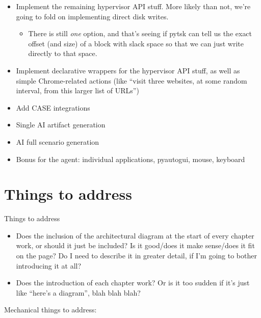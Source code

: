 \begin{itemize}
\tightlist
\item
  Implement the remaining hypervisor API stuff. More likely than not,
  we're going to fold on implementing direct disk writes.

  \begin{itemize}
  \tightlist
  \item
    There is still \emph{one} option, and that's seeing if pytsk can
    tell us the exact offset (and size) of a block with slack space so
    that we can just write directly to that space.
  \end{itemize}
\item
  Implement declarative wrappers for the hypervisor API stuff, as well
  as simple Chrome-related actions (like ``visit three websites, at some
  random interval, from this larger list of URLs'')
\item
  Add CASE integrations
\item
  Single AI artifact generation
\item
  AI full scenario generation
\item
  Bonus for the agent: individual applications, pyautogui, mouse,
  keyboard
\end{itemize}

\section{Things to address}\label{things-to-address}

Things to address

\begin{itemize}
\tightlist
\item
  Does the inclusion of the architectural diagram at the start of every
  chapter work, or should it just be included? Is it good/does it make
  sense/does it fit on the page? Do I need to describe it in greater
  detail, if I'm going to bother introducing it at all?
\item
  Does the introduction of each chapter work? Or is it too sudden if
  it's just like ``here's a diagram'', blah blah blah?
\end{itemize}

Mechanical things to address:

